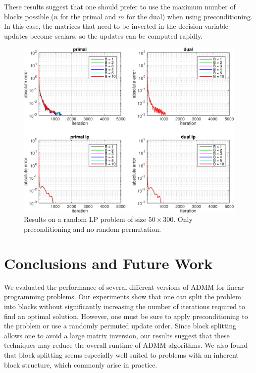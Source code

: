 \documentclass{article}
\begin{document}
These results suggest that one should prefer to use the maximum number of blocks possible ($n$ for the primal and $m$ for the dual) when using preconditioning. In this case, the matrices that need to be inverted in the decision variable updates become scalars, so the updates can be computed rapidly.
\newline
\newline
\newline
\newline
\begin{figure}[h]
	\includegraphics[width=\textwidth]{../figures/precond_norndperm.png}
	\caption{Results on a random LP problem of size $50 \times 300$. Only preconditioning and no random permutation.}
	\label{fig:p_nor}
\end{figure}

\newpage


\vspace{0.1in}
\section{Conclusions and Future Work}

We evaluated the performance of several different versions of ADMM for linear programming problems. Our experiments show that one can split the problem into blocks without significantly increasing the number of iterations required to find an optimal solution. However, one must be sure to apply preconditioning to the problem or use a randomly permuted update order. Since block splitting allows one to avoid a large matrix inversion, our results suggest that these techniques may reduce the overall runtime of ADMM algorithms. We also found that block splitting seems especially well suited to problems with an inherent block structure, which commonly arise in practice.
\end{document}
